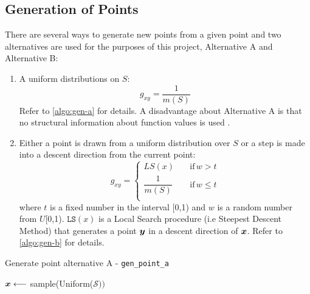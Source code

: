 



\subsection{Generation of Points} 
\label{sec:gen-points}
There are several ways to generate new points from a given point and two alternatives are used for the purposes of 
this project, Alternative A and Alternative B:
\begin{enumerate}[label=\textbf{(\Alph*)}]
    \item A uniform distributions on $S$:
    \begin{equation}
        g_{xy}=\frac{1}{m(S)} 
    \end{equation}
    Refer to \cref{algo:gen-a} for details. A disadvantage about Alternative A is that no structural information about 
    function values is used \cite{dekkers}.

    \item Either a point is drawn from a uniform distribution over $S$ or a step is made into a descent direction from the current point:
    \begin{equation}
    g_{xy}=\begin{cases}
          LS(x) \quad &\text{if} \, w>t \\
          \dfrac{1}{m(S)} \quad &\text{if} \, w \leq t \\
     \end{cases} 
    \end{equation}
    where $t$ is a fixed number in the interval [0,1) and $w$ is a random number from $U$[0,1). 
    $\texttt{LS}(x)$ is a Local Search procedure (i.e Steepest Descent Method) that generates a point $\boldsymbol{y}$ in a 
    descent direction of $\boldsymbol{x}$. \cite{dekkers}
    Refer to \cref{algo:gen-b} for details.
\end{enumerate}


\begin{algorithm}
\caption{Generate point alternative A - \texttt{gen\_point\_a}}
\label{algo:gen-a}
\vspace{8pt}
\nosemic
\SetAlgoLined
{}

$\boldsymbol{x} \longleftarrow$ sample(Uniform($\mathcal{S})) $ \;


\end{algorithm}

